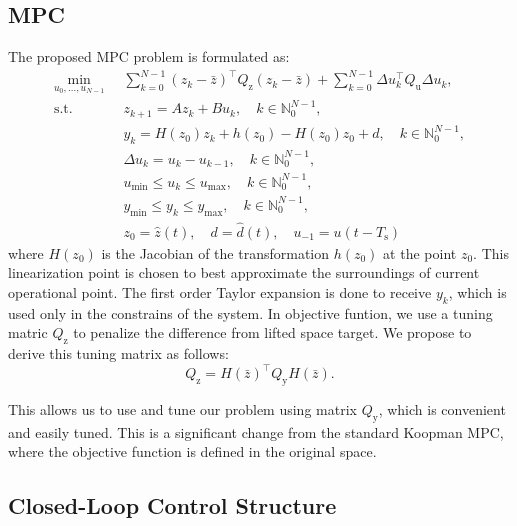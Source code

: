 \documentclass[preprint,12pt,authoryear]{elsarticle}
\newcommand{\ui}[2]{#1_{\text{#2}}}
\begin{document}
\subsection{MPC}
The proposed MPC problem is formulated as:
\begin{subequations}
  \label{eq:cs:mpc}
  \begin{align}
    \min_{u_0, \ldots, u_{N-1}} \; & \; \sum_{k=0}^{N-1} (z_k - \bar{z})^\intercal Q_\text{z} (z_k - \bar{z}) + \sum_{k=0}^{N-1} \Delta u_k^\intercal Q_\text{u} \Delta u_k, \label{eq:cs:mpc:obj} \\
    \text{s.t.}\;\;\;\; & \; z_{k+1} = A z_k + B u_k, \quad k\in\mathbb{N}_0^{N-1}, \label{eq:cs:mpc:z} \\
    & \; y_k = H(z_0) z_k + h(z_0) - H(z_0)z_0 + d, \quad k\in\mathbb{N}_0^{N-1}, \label{eq:cs:mpc:y} \\
    & \; \Delta u_k = u_k - u_{k-1}, \quad k\in\mathbb{N}_0^{N-1}, \label{eq:cs:mpc:du} \\
    & \; u_{\min} \leq u_k \leq u_{\max}, \quad k\in\mathbb{N}_0^{N-1}, \label{eq:cs:mpc:u} \\
    & \; y_{\min} \leq y_k \leq y_{\max}, \quad k\in\mathbb{N}_0^{N-1}, \label{eq:cs:mpc:ycon} \\
    & \; z_0 = \hat{z}(t), \quad d = \hat{d}(t), \quad u_{-1} = u(t-T_\text{s}) \label{eq:cs:mpc:init}
  \end{align}
\end{subequations}
where \(H(z_0)\) is the Jacobian of the transformation \(h(z_0)\) at the point \(z_0\). This linearization point is chosen to best approximate the surroundings of current operational point. The first order Taylor expansion is done to receive \(y_k\), which is used only in the constrains of the system. In objective funtion, we use a tuning matric \(\ui{Q}{z}\) to penalize the difference from lifted space target. We propose to derive this tuning matrix as follows:
\begin{equation}
  Q_\text{z} = H(\bar{z})^\intercal Q_\text{y} H(\bar{z}).
\end{equation}

This allows us to use and tune our problem using matrix \(\ui{Q}{y}\), which is convenient and easily tuned. 
This is a significant change from the standard Koopman MPC, where the objective function is defined in the original space. 

\subsection{Closed-Loop Control Structure}
\end{document}
